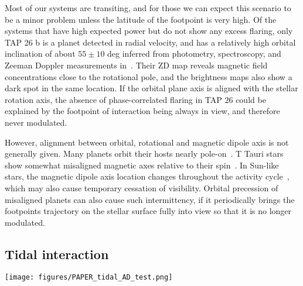 \documentclass[twocolumn]{aastex631}
\begin{document}
Most of our systems are transiting, and for those we can expect this scenario to be a minor problem unless the latitude of the footpoint is very high. Of the systems that have high expected power but do not show any excess flaring, only TAP 26 b is a planet detected in radial velocity, and has a relatively high orbital inclination of about $55\pm10$ deg inferred from photometry, spectroscopy, and Zeeman Doppler measurements in~\citet{yu2017hot}. Their ZD map reveals magnetic field concentrations close to the rotational pole, and the brightness maps also show a dark spot in the same location. If the orbital plane axis is aligned with the stellar rotation axis, the absence of phase-correlated flaring in TAP 26 could be explained by the footpoint of interaction being always in view, and therefore never modulated. 

However, alignment between orbital, rotational and magnetic dipole axis is not generally given. Many planets orbit their hosts nearly pole-on~\citep{albrecht2012obliquities, albrecht2022stellar, bourrier2023dream}. T Tauri stars show somewhat misaligned magnetic axes relative to their spin~\citep{mcginnis2020magnetic}. In Sun-like stars, the magnetic dipole axis location changes throughout the activity cycle~\citep{petit2009polarity,borosaikia2018direct}, which may also cause temporary cessation of visibility. Orbital precession of misaligned planets can also cause such intermittency, if it periodically brings the footpoints trajectory on the stellar surface fully into view so that it is no longer modulated. 



\subsection{Tidal interaction}
\label{sec:discussion:tidal}
\begin{figure*}[t]
    \begin{centering}
        \texttt{[image: figures/PAPER\_tidal\_AD\_test.png]}
    \caption{Deviation from random flare times in phase with $P_{\rm orb}/2$, i.e., in phase with the two tidal bulges raised on the star, compared to different models of tidal interaction~(Section~\ref{sec:discussion:tidal}). \textbf{Cross symbols} mark planets with $M_{\rm p} \sin i$ measurements. \textbf{Round symbols} mark planets with measured  or estimated $M_{\rm p}$ (see Section~\ref{sec:discussion:mpms}). 
           \textbf{Left panel}: Tidal torque in the system for stars with a convective envelope. Blue color indicates that the star rotates slower than the planet orbits, so that angular momentum is transferred from the orbit to the spin of the star. Grey color is the reverse. \textbf{Middle panel}: The tidal dissipation timescale. \textbf{Right panel}:  Relative gravitational perturbation in the star.}
        \label{fig:tidal}
    \end{centering}
\end{figure*}
\end{document}
